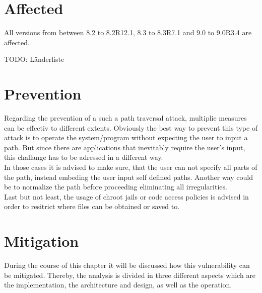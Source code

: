 \section{Affected}
\label{affected}
All versions from between 8.2 to 8.2R12.1, 8.3 to 8.3R7.1 and 9.0 to 9.0R3.4 are affected. \autocite{NVDCVE:online}

TODO: Länderliste

\section{Prevention}
\label{prevention}
Regarding the prevention of a such a path traversal attack, multiplie measures can be effectiv to different extents. Obviously the best way to prevent this type of attack is to operate the system/program without expecting the user to input a path. But since there are applications that inevitably require the user's input, this challange has to be adressed in a different way. \autocite{OWASP-PathTraversal:online}\\
In those cases it is advised to make sure, that the user can not specify all parts of the path, instead embeding the user input self defined paths. Another way could be to normalize the path before proceeding eliminating all irregularities. \autocite{OWASP-PathTraversal:online}\\
Last but not least, the usage of chroot jails or code access policies is advised in order to resitrict where files can be obtained or saved to. \autocite{OWASP-PathTraversal:online}

\section{Mitigation}
\label{mitigation}
During the course of this chapter it will be discussed how this vulnerability can be mitigated. Thereby, the analysis is divided in three different aspects which are the implementation, the architecture and design, as well as the operation.

